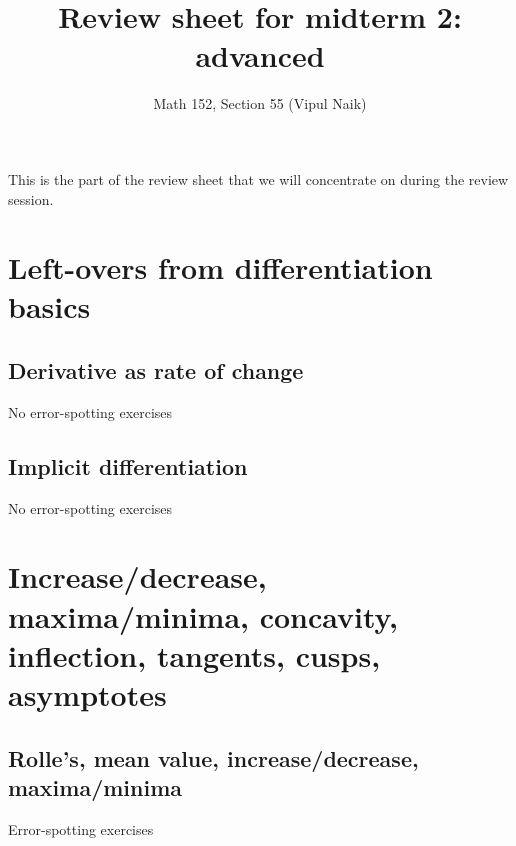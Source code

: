 \documentclass[10pt]{amsart}
\title{Review sheet for midterm 2: advanced}
\author{Math 152, Section 55 (Vipul Naik)}
\begin{document}
\maketitle

This is the part of the review sheet that we will concentrate on during the review session.

\section{Left-overs from differentiation basics}

\subsection{Derivative as rate of change}

No error-spotting exercises
\subsection{Implicit differentiation}

No error-spotting exercises

\section{Increase/decrease, maxima/minima, concavity, inflection, tangents, cusps, asymptotes}

\subsection{Rolle's, mean value, increase/decrease, maxima/minima}

Error-spotting exercises
\end{document}
